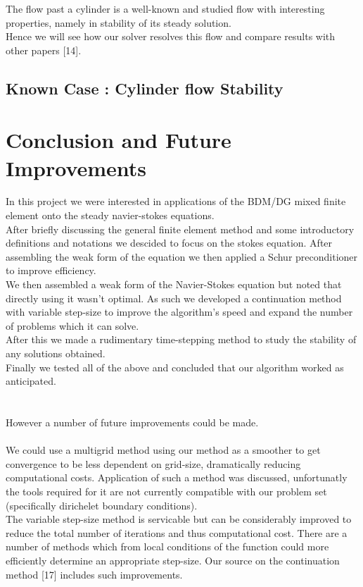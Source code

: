 \documentclass[11pt,twoside,a4paper]{article}
\begin{document}
The flow past a cylinder is a well-known and studied flow with interesting properties, namely in stability of its steady solution.\\
Hence we will see how our solver resolves this flow and compare results with other papers [14].

\subsection{Known Case : Cylinder flow Stability}

\section{Conclusion and Future Improvements}

In this project we were interested in applications of the BDM/DG mixed finite element onto the steady navier-stokes equations.\\
After briefly discussing the general finite element method and some introductory definitions and notations we descided to focus on the stokes equation. After assembling the weak form of the equation we then applied a Schur preconditioner to  improve efficiency.\\
We then assembled a weak form of the Navier-Stokes equation but noted that directly using it wasn't optimal. As such we developed a continuation method with variable step-size to improve the algorithm's speed and expand the number of problems which it can solve.\\
After this we made a rudimentary time-stepping method to study the stability of any solutions obtained.\\
Finally we tested all of the above and concluded that our algorithm worked as anticipated.\\
\\
\\
However a number of future improvements could be made.\\
\\
We could use a multigrid method using our method as a smoother to get convergence to be less dependent on grid-size, dramatically reducing computational costs. Application of such a method was discussed, unfortunatly the tools required for it are not currently compatible with our problem set (specifically dirichelet boundary conditions).\\
The variable step-size method is servicable but can be considerably improved to reduce the total number of iterations and thus computational cost. There are a number of methods which from local conditions of the function could more efficiently determine an appropriate step-size. Our source on the continuation method [17] includes such improvements.\\
\end{document}
